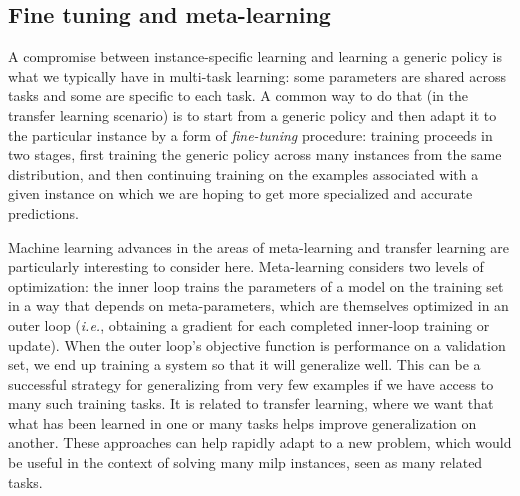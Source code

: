 \documentclass[11pt]{article}
\begin{document}
	\subsection{Fine tuning and meta-learning}
		A compromise between instance-specific learning and learning a generic policy is what we typically
		have in multi-task learning: some parameters are shared across tasks and some are specific to each
		task.
		A common way to do that (in the transfer learning scenario) is to start from a generic policy and
		then adapt it to the particular instance by a form of \emph{fine-tuning} procedure: training
		proceeds in two stages, first training the generic policy across many instances from the same
		distribution, and then continuing training on the examples associated with a given instance on
		which we are hoping to get more specialized and accurate predictions.

		Machine learning advances in the areas of meta-learning and transfer learning are particularly
		interesting to consider here.
		Meta-learning considers two levels of optimization: the inner loop trains the parameters of a model
		on the training set in a way that depends on meta-parameters, which are themselves optimized in an
		outer loop (\textit{i.e.}, obtaining a gradient for each completed inner-loop training or update).
		When the outer loop's objective function is performance on a validation set, we end up training a
		system so that it will generalize well.
		This can be a successful strategy for generalizing from very few examples if we have access to many
		such training tasks.
		It is related to transfer learning, where we want that what has been learned in one or many tasks
		helps improve generalization on another.
		These approaches can help rapidly adapt to a new problem, which would be useful in the context of
		solving many \gls{milp} instances, seen as many related tasks.
\end{document}
